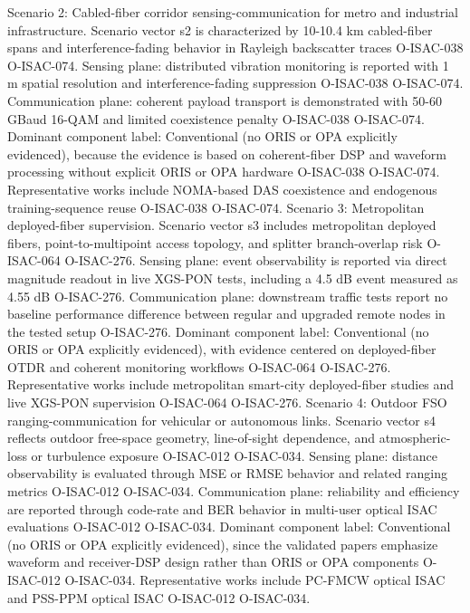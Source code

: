 {}Scenario 2: Cabled-fiber corridor sensing-communication for metro and industrial infrastructure.\markdownRendererHardLineBreak
{}Scenario vector s2 is characterized by 10-10.4 km cabled-fiber spans and interference-fading behavior in Rayleigh backscatter traces O-ISAC-038 O-ISAC-074. Sensing plane: distributed vibration monitoring is reported with 1 m spatial resolution and interference-fading suppression O-ISAC-038 O-ISAC-074. Communication plane: coherent payload transport is demonstrated with 50-60 GBaud 16-QAM and limited coexistence penalty O-ISAC-038 O-ISAC-074. Dominant component label: Conventional (no ORIS or OPA explicitly evidenced), because the evidence is based on coherent-fiber DSP and waveform processing without explicit ORIS or OPA hardware O-ISAC-038 O-ISAC-074. Representative works include NOMA-based DAS coexistence and endogenous training-sequence reuse O-ISAC-038 O-ISAC-074.\markdownRendererParagraphSeparator
{}Scenario 3: Metropolitan deployed-fiber supervision.\markdownRendererHardLineBreak
{}Scenario vector s3 includes metropolitan deployed fibers, point-to-multipoint access topology, and splitter branch-overlap risk O-ISAC-064 O-ISAC-276. Sensing plane: event observability is reported via direct magnitude readout in live XGS-PON tests, including a 4.5 dB event measured as 4.55 dB O-ISAC-276. Communication plane: downstream traffic tests report no baseline performance difference between regular and upgraded remote nodes in the tested setup O-ISAC-276. Dominant component label: Conventional (no ORIS or OPA explicitly evidenced), with evidence centered on deployed-fiber OTDR and coherent monitoring workflows O-ISAC-064 O-ISAC-276. Representative works include metropolitan smart-city deployed-fiber studies and live XGS-PON supervision O-ISAC-064 O-ISAC-276.\markdownRendererParagraphSeparator
{}Scenario 4: Outdoor FSO ranging-communication for vehicular or autonomous links.\markdownRendererHardLineBreak
{}Scenario vector s4 reflects outdoor free-space geometry, line-of-sight dependence, and atmospheric-loss or turbulence exposure O-ISAC-012 O-ISAC-034. Sensing plane: distance observability is evaluated through MSE or RMSE behavior and related ranging metrics O-ISAC-012 O-ISAC-034. Communication plane: reliability and efficiency are reported through code-rate and BER behavior in multi-user optical ISAC evaluations O-ISAC-012 O-ISAC-034. Dominant component label: Conventional (no ORIS or OPA explicitly evidenced), since the validated papers emphasize waveform and receiver-DSP design rather than ORIS or OPA components O-ISAC-012 O-ISAC-034. Representative works include PC-FMCW optical ISAC and PSS-PPM optical ISAC O-ISAC-012 O-ISAC-034.\markdownRendererInterblockSeparator
